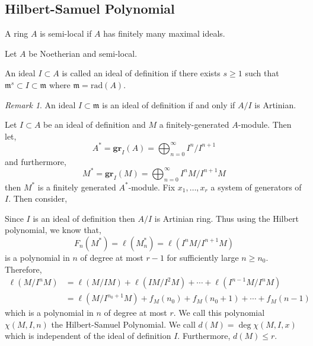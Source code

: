 \documentclass[12pt]{article}
\newcommand{\rad}[1]{\mathrm{rad}\left( #1 \right)}
\newcommand{\gr}[2]{\mathbf{gr}_{#1}\left(#2\right)}
\newcommand{\m}{\mathfrak{m}}
\theoremstyle{remark}
\newtheorem*{remark}{Remark}
\theoremstyle{definition}
\newenvironment{definition}[1][Definition:]{\begin{trivlist}
\item[\hskip \labelsep {\bfseries #1}]}{\end{trivlist}}
\begin{document}
\subsection{Hilbert-Samuel Polynomial}

\begin{definition}
A ring $A$ is semi-local if $A$ has finitely many maximal ideals.
\end{definition}

Let $A$ be Noetherian and semi-local. 

\begin{definition}
An ideal $I \subset A$ is called an ideal of definition if there exists $s \ge 1$ such that $\m^s \subset I \subset \m$ where $\m = \rad{A}$. 
\end{definition}

\begin{remark}
An ideal $I \subset \m$ is an ideal of definition if and only if $A / I$ is Artinian. 
\end{remark}

\begin{definition}
Let $I \subset A$ be an ideal of definition and $M$ a finitely-generated $A$-module. Then let,
\[ A^* = \gr{I}{A} = \bigoplus_{n = 0}^{\infty} I^n / I^{n+1} \]
and furthermore,
\[ M^* = \gr{I}{M} = \bigoplus_{n = 0}^\infty I^n M / I^{n+1} M \]
then $M^*$ is a finitely generated $A^*$-module. Fix $x_1, \dots, x_r$ a system of generators of $I$. Then consider,
\begin{center}
\end{center}
Since $I$ is an ideal of definition then $A / I$ is Artinian ring. Thus using the Hilbert polynomial, we know that,
\[ F_n(M^*) = \ell(M_n^*) = \ell(I^n M / I^{n+1}M) \]
is a polynomial in $n$ of degree at most $r - 1$ for sufficiently large $n \ge n_0$. Therefore,
\begin{align*}
\ell(M / I^n M) & = \ell(M/IM) + \ell(IM/I^2M) + \cdots + \ell(I^{n-1}M/I^n M) 
\\
& = \ell(M / I^{n_0 + 1}M) + f_M(n_0) + f_M(n_0 + 1) + \cdots + f_M(n-1) 
\end{align*}
which is a polynomial in $n$ of degree at most $r$. We call this polynomial $\chi(M, I, n)$ the Hilbert-Samuel Polynomial. We call $d(M) = \deg{\chi(M, I, x)}$ which is independent of the ideal of definition $I$. Furthermore, $d(M) \le r$.   
\end{definition}
\end{document}
